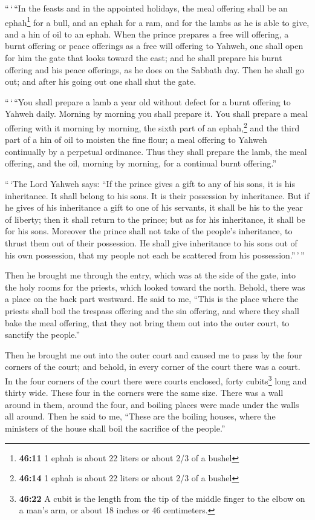  ``\,`\,``In the feasts and in the appointed holidays,
the meal offering shall be an ephah\footnote{\textbf{46:11} 1 ephah is
  about 22 liters or about 2/3 of a bushel} for a bull, and an ephah for
a ram, and for the lambs as he is able to give, and a hin of oil to an
ephah.  When the prince prepares a free will offering, a
burnt offering or peace offerings as a free will offering to Yahweh, one
shall open for him the gate that looks toward the east; and he shall
prepare his burnt offering and his peace offerings, as he does on the
Sabbath day. Then he shall go out; and after his going out one shall
shut the gate.

 ``\,`\,``You shall prepare a lamb a year old without
defect for a burnt offering to Yahweh daily. Morning by morning you
shall prepare it.  You shall prepare a meal offering with
it morning by morning, the sixth part of an ephah,\footnote{\textbf{46:14}
  1 ephah is about 22 liters or about 2/3 of a bushel} and the third
part of a hin of oil to moisten the fine flour; a meal offering to
Yahweh continually by a perpetual ordinance.  Thus they
shall prepare the lamb, the meal offering, and the oil, morning by
morning, for a continual burnt offering.''

 ``\,`The Lord Yahweh says: ``If the prince gives a gift
to any of his sons, it is his inheritance. It shall belong to his sons.
It is their possession by inheritance.  But if he gives
of his inheritance a gift to one of his servants, it shall be his to the
year of liberty; then it shall return to the prince; but as for his
inheritance, it shall be for his sons.  Moreover the
prince shall not take of the people's inheritance, to thrust them out of
their possession. He shall give inheritance to his sons out of his own
possession, that my people not each be scattered from his
possession.''\,'\,''

 Then he brought me through the entry, which was at the
side of the gate, into the holy rooms for the priests, which looked
toward the north. Behold, there was a place on the back part westward.
 He said to me, ``This is the place where the priests
shall boil the trespass offering and the sin offering, and where they
shall bake the meal offering, that they not bring them out into the
outer court, to sanctify the people.''

 Then he brought me out into the outer court and caused
me to pass by the four corners of the court; and behold, in every corner
of the court there was a court.  In the four corners of
the court there were courts enclosed, forty cubits\footnote{\textbf{46:22}
  A cubit is the length from the tip of the middle finger to the elbow
  on a man's arm, or about 18 inches or 46 centimeters.} long and thirty
wide. These four in the corners were the same size. 
There was a wall around in them, around the four, and boiling places
were made under the walls all around.  Then he said to
me, ``These are the boiling houses, where the ministers of the house
shall boil the sacrifice of the people.''


